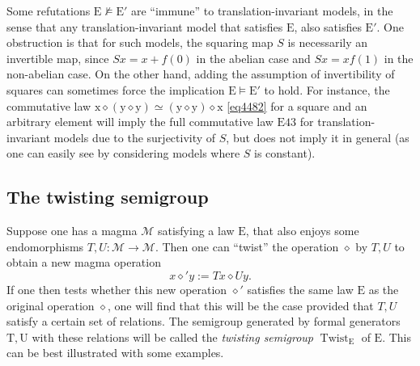 \documentclass[12pt]{amsart}
\theoremstyle{definition}
\newcommand{\x}{\mathrm{x}}
\newcommand{\y}{\mathrm{y}}
\newcommand{\op}{\diamond}
\newcommand{\formaleq}{\simeq}
\newcommand{\nmodels}{\not\models}
\newcommand{\Magma}{{\mathcal{M}}}
\newcommand{\Eq}[1]{\mathrm{E}#1}
\newcommand{\E}{\mathrm{E}}
\begin{document}
  Some refutations $\E \nmodels {\E'}$ are ``immune'' to translation-invariant models, in the sense that any translation-invariant model that satisfies $\E$, also satisfies ${\E'}$.  One obstruction is that for such models, the squaring map $S$ is necessarily an invertible map, since $Sx = x + f(0)$ in the abelian case and $Sx = xf(1)$ in the non-abelian case. On the other hand, adding the assumption of invertibility of squares can sometimes force the implication $\E \models {\E'}$ to hold.  For instance, the commutative law $\x \op (\y \op \y) \formaleq (\y \op \y) \op \x$ \eqref{eq4482} for a square and an arbitrary element will imply the full commutative law $\Eq{43}$ for translation-invariant models due to the surjectivity of $S$, but does not imply it in general (as one can easily see by considering models where $S$ is constant).

\subsection{The twisting semigroup}\label{twisting-sec}

Suppose one has a magma $\Magma$ satisfying a law $\E$, that also enjoys some endomorphisms $T, U \colon \Magma \to \Magma$.  Then one can ``twist'' the operation $\op$ by $T,U$ to obtain a new magma operation
\begin{equation}\label{twist} x \op' y := Tx \op Uy.
\end{equation}
If one then tests whether this new operation $\op'$ satisfies the same law $\E$ as the original operation $\op$, one will find that this will be the case provided that $T,U$ satisfy a certain set of relations.  The semigroup generated by formal generators $\mathrm{T}, \mathrm{U}$ with these relations will be called the \emph{twisting semigroup} $\operatorname{Twist}_\E$ of $\E$.  This can be best illustrated with some examples.
\end{document}
